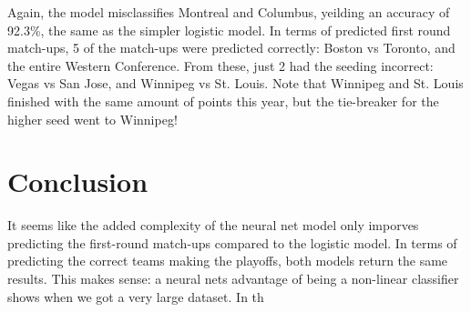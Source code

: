 \documentclass[10pt,letterpaper]{article}
\begin{document}
Again, the model misclassifies Montreal and Columbus, yeilding an accuracy of 92.3\%, the same as the simpler logistic model. In terms of predicted first round match-ups,  5 of the match-ups were predicted correctly: Boston vs Toronto, and the entire Western Conference. From these, just 2 had the seeding incorrect: Vegas vs San Jose, and Winnipeg vs St. Louis. Note that Winnipeg and St. Louis finished with the same amount of points this year, but the tie-breaker for the higher seed went to Winnipeg!

\section*{Conclusion}
It seems like the added complexity of the neural net model only imporves predicting the first-round match-ups compared to the logistic model. In terms of predicting the correct teams making the playoffs, both models return the same results. This makes sense: a neural nets advantage of being a non-linear classifier shows when we got a very large dataset. In th 
\end{document}
